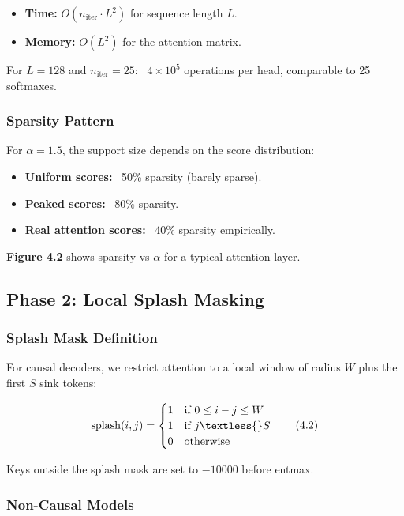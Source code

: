 \begin{itemize}
\item \textbf{Time:} $O(n_\text{iter} \cdot L^2)$ for sequence length $L$.
\item \textbf{Memory:} $O(L^2)$ for the attention matrix.

\end{itemize}
For $L = 128$ and $n_\text{iter} = 25$: ~$4 \times 10^5$ operations per head, 
comparable to 25 softmaxes.

\subsubsection{Sparsity Pattern}

For $\alpha = 1.5$, the support size depends on the score distribution:

\begin{itemize}
\item \textbf{Uniform scores:} ~50\% sparsity (barely sparse).
\item \textbf{Peaked scores:} ~80\% sparsity.
\item \textbf{Real attention scores:} ~40\% sparsity empirically.

\end{itemize}
\textbf{Figure 4.2} shows sparsity vs $\alpha$ for a typical attention layer.

\subsection{Phase 2: Local Splash Masking}

\subsubsection{Splash Mask Definition}

For causal decoders, we restrict attention to a local window of radius $W$ 
plus the first $S$ sink tokens:

\[
\text{splash}(i, j) = \begin{cases}
1 & \text{if } 0 \leq i - j \leq W \\
1 & \text{if } j \textless{} S \\
0 & \text{otherwise}
\end{cases}
\tag{4.2}
\]

Keys outside the splash mask are set to $-10000$ before entmax.

\subsubsection{Non-Causal Models}

